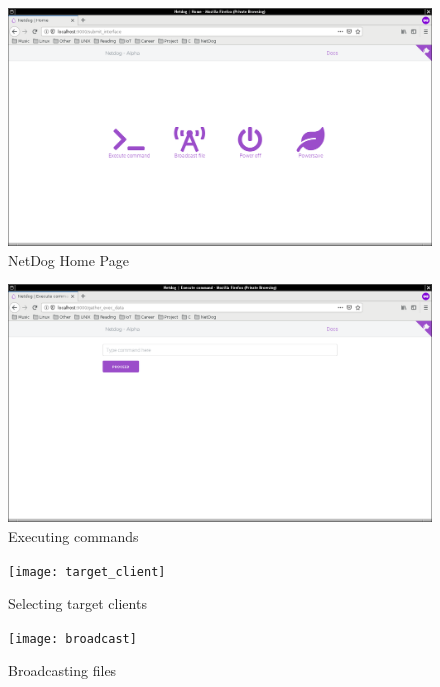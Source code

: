 \begin{figure}[H]
\includegraphics[scale=0.3]{netdog_home}
\caption{NetDog Home Page}
\end{figure}

\begin{figure}[H]
\includegraphics[scale=0.3]{netdog_execute}
\caption{Executing commands}
\end{figure}

\begin{figure}[H]
\texttt{[image: target\_client]}
\caption{Selecting target clients}
\end{figure}

\begin{figure}[H]
\texttt{[image: broadcast]}
\caption{Broadcasting files}
\end{figure}
